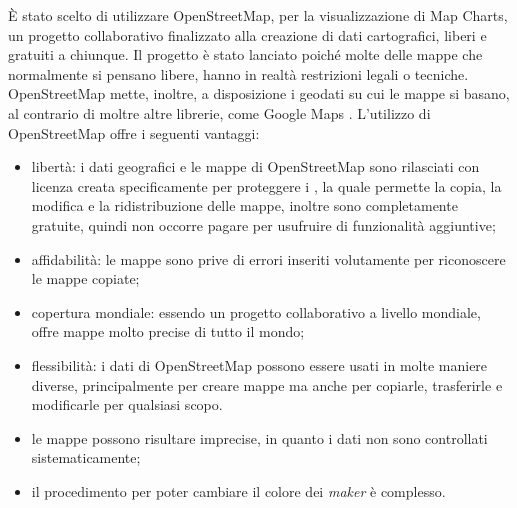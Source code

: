 È stato scelto di utilizzare OpenStreetMap, per la visualizzazione di Map Charts, un progetto collaborativo finalizzato alla creazione di dati cartografici, liberi e gratuiti a chiunque. Il progetto è stato lanciato poiché molte delle mappe che normalmente si pensano libere, hanno in realtà restrizioni legali o tecniche. OpenStreetMap mette, inoltre, a disposizione i geodati su cui le mappe si basano, al contrario di moltre altre librerie, come Google Maps .
L'utilizzo di OpenStreetMap offre i seguenti vantaggi:
\begin{itemize}
\item libertà: i dati geografici e le mappe di OpenStreetMap sono rilasciati con licenza creata specificamente per proteggere i , la quale permette la copia, la modifica e la ridistribuzione delle mappe, inoltre sono completamente gratuite, quindi non occorre pagare per usufruire di funzionalità aggiuntive;
\item affidabilità: le mappe sono prive di errori inseriti volutamente per riconoscere le mappe copiate;
\item copertura mondiale: essendo un progetto collaborativo a livello mondiale, offre mappe molto precise di tutto il mondo;
\item flessibilità: i dati di OpenStreetMap possono essere usati in molte maniere diverse, principalmente per creare mappe ma anche per copiarle, trasferirle e modificarle per qualsiasi scopo.
\end{itemize}
\begin{itemize}
\item le mappe possono risultare imprecise, in quanto i dati non sono controllati sistematicamente;
\item il procedimento per poter cambiare il colore dei \textit{maker} è complesso.
\end{itemize}


